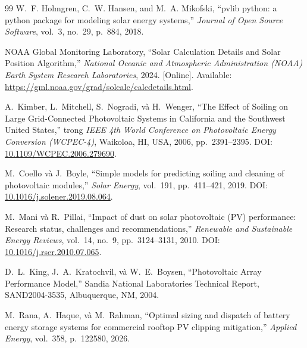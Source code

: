 \documentclass[12pt, a4paper]{report}
\begin{document}
\begin{thebibliography}{99}
W.~F. Holmgren, C.~W. Hansen, and M.~A. Mikofski,
\newblock ``pvlib python: a python package for modeling solar energy systems,''
\newblock \textit{Journal of Open Source Software}, vol.~3, no.~29, p.~884, 2018.

NOAA Global Monitoring Laboratory,
\newblock ``Solar Calculation Details and Solar Position Algorithm,''
\newblock \textit{National Oceanic and Atmospheric Administration (NOAA) Earth System Research Laboratories}, 2024. [Online]. Available: \url{https://gml.noaa.gov/grad/solcalc/calcdetails.html}.

A.~Kimber, L.~Mitchell, S.~Nogradi, và H.~Wenger,
\newblock ``The Effect of Soiling on Large Grid-Connected Photovoltaic Systems in California and the Southwest United States,''
\newblock trong \textit{IEEE 4th World Conference on Photovoltaic Energy Conversion (WCPEC-4)}, Waikoloa, HI, USA, 2006, pp.~2391--2395.
\newblock DOI: \href{https://doi.org/10.1109/WCPEC.2006.279690}{10.1109/WCPEC.2006.279690}.

M.~Coello và J.~Boyle,
\newblock ``Simple models for predicting soiling and cleaning of photovoltaic modules,''
\newblock \textit{Solar Energy}, vol.~191, pp.~411--421, 2019.
\newblock DOI: \href{https://doi.org/10.1016/j.solener.2019.08.064}{10.1016/j.solener.2019.08.064}.

M.~Mani và R.~Pillai,
\newblock ``Impact of dust on solar photovoltaic (PV) performance: Research status, challenges and recommendations,''
\newblock \textit{Renewable and Sustainable Energy Reviews}, vol.~14, no.~9, pp.~3124--3131, 2010.
\newblock DOI: \href{https://doi.org/10.1016/j.rser.2010.07.065}{10.1016/j.rser.2010.07.065}.

D.~L.~King, J.~A.~Kratochvil, và W.~E.~Boysen,
\newblock ``Photovoltaic Array Performance Model,''
\newblock Sandia National Laboratories Technical Report, SAND2004-3535, Albuquerque, NM, 2004.

M.~Rana, A.~Haque, và M.~Rahman,
\newblock ``Optimal sizing and dispatch of battery energy storage systems for commercial rooftop PV clipping mitigation,''
\newblock \textit{Applied Energy}, vol.~358, p.~122580, 2026.

\end{thebibliography}
\end{document}
